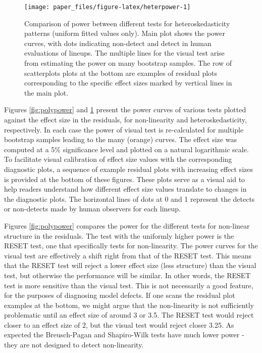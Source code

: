 \documentclass[]{interact}
\theoremstyle{plain}%
\theoremstyle{definition}
\theoremstyle{remark}
\begin{document}
\begin{figure}

{\centering \texttt{[image: paper\_files/figure-latex/heterpower-1]} 

}

\caption{Comparison of power between different tests for heteroskedasticity patterns (uniform fitted values only). Main plot shows the power curves, with dots indicating non-detect and detect in human evaluations of lineups. The multiple lines for the visual test arise from estimating the power on many bootstrap samples. The row of scatterplots plots at the bottom are examples of residual plots corresponding to the specific effect sizes marked by vertical lines in the main plot.}\label{fig:heterpower}
\end{figure}

Figures \ref{fig:polypower} and \ref{fig:heterpower} present the power
curves of various tests plotted against the effect size in the
residuals, for non-linearity and heteroskedasticity, respectively. In
each case the power of visual test is re-calculated for multiple
bootstrap samples leading to the many (orange) curves. The effect size
was computed at a 5\% significance level and plotted on a natural
logarithmic scale. To facilitate visual calibration of effect size
values with the corresponding diagnostic plots, a sequence of example
residual plots with increasing effect sizes is provided at the bottom of
these figures. These plots serve as a visual aid to help readers
understand how different effect size values translate to changes in the
diagnostic plots. The horizontal lines of dots at 0 and 1 represent the
detects or non-detects made by human observers for each lineup.

Figures \ref{fig:polypower} compares the power for the different tests
for non-linear structure in the residuals. The test with the uniformly
higher power is the RESET test, one that specifically tests for
non-linearity. The power curves for the visual test are effectively a
shift right from that of the RESET test. This means that the RESET test
will reject a lower effect size (less structure) than the visual test,
but otherwise the performance will be similar. In other words, the RESET
test is more sensitive than the visual test. This is not necessarily a
good feature, for the purposes of diagnosing model defects. If one scans
the residual plot examples at the bottom, we might argue that the
non-linearity is not sufficiently problematic until an effect size of
around 3 or 3.5. The RESET test would reject closer to an effect size of
2, but the visual test would reject closer 3.25. As expected the
Breusch-Pagan and Shapiro-Wilk tests have much lower power - they are
not designed to detect non-linearity.
\end{document}
